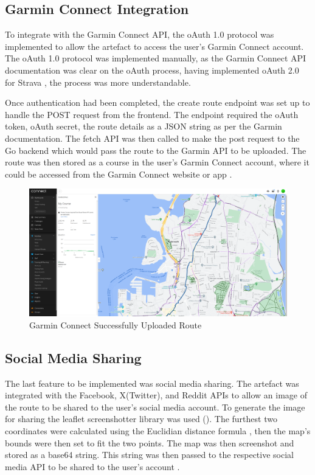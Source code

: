 \subsection{Garmin Connect Integration}
\label{iteration3:garmin-integration}

To integrate with the Garmin Connect API, the oAuth 1.0 protocol was implemented to allow the artefact to access the user's Garmin Connect account. The oAuth 1.0 protocol was implemented manually, as the Garmin Connect API documentation was clear on the oAuth process, having implemented oAuth 2.0 for Strava , the process was more understandable.

Once authentication had been completed, the create route endpoint was set up to handle the POST request from the frontend. The endpoint required the oAuth token, oAuth secret, the route details as a JSON string as per the Garmin documentation. The fetch API was then called to make the post request to the Go backend which would pass the route to the Garmin API to be uploaded. The route was then stored as a course in the user's Garmin Connect account, where it could be accessed from the Garmin Connect website or app . 

\begin{figure}[!ht]
  \centering
  \includegraphics[width=425px]{figures/Progress Images/Iteration-3/SR50/SR50 - Garmin Connect App Course Viewer.png}
  \caption{Garmin Connect Successfully Uploaded Route}
  \label{fig:garmin-connect}
\end{figure}

\subsection{Social Media Sharing}
\label{iteration3:social-sharing}

The last feature to be implemented was social media sharing. The artefact was integrated with the Facebook, X(Twitter), and Reddit APIs to allow an image of the route to be shared to the user's social media account. To generate the image for sharing the leaflet screenshotter library was used (\cite{noauthor_leaflet-simple-map-screenshoter_2022}). The furthest two coordinates were calculated using the Euclidian distance formula , then the map's bounds were then set to fit the two points. The map was then screenshot and stored as a base64 string. This string was then passed to the respective social media API to be shared to the user's account .

